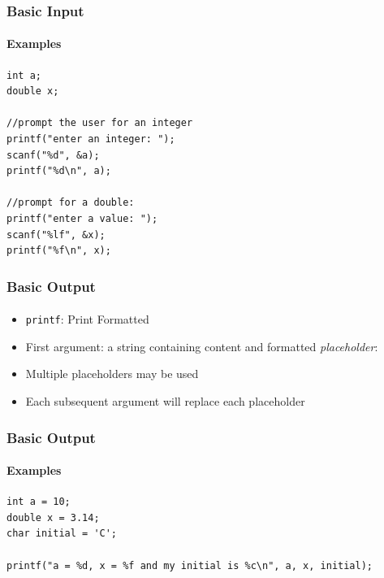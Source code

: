 \documentclass[]{beamer}
\begin{document}
\begin{frame}[fragile]
    \frametitle{Basic Input}
    \framesubtitle{Examples}

\begin{verbatim}
int a;
double x;

//prompt the user for an integer
printf("enter an integer: ");
scanf("%d", &a);
printf("%d\n", a);

//prompt for a double:
printf("enter a value: ");
scanf("%lf", &x);
printf("%f\n", x);
\end{verbatim}

\end{frame}


\begin{frame}[fragile]
    \frametitle{Basic Output}
    \framesubtitle{}

\begin{itemize}[<+->]
  \item \texttt{printf}: Print Formatted
  \item First argument: a string containing content and formatted \emph{placeholder}:
  \item Multiple placeholders may be used
  \item Each subsequent argument will replace each placeholder
\end{itemize}
  
\end{frame}


\begin{frame}[fragile]
    \frametitle{Basic Output}
    \framesubtitle{Examples}

\begin{verbatim}
int a = 10;
double x = 3.14;
char initial = 'C';

printf("a = %d, x = %f and my initial is %c\n", a, x, initial);
\end{verbatim}

\end{frame}
\end{document}
